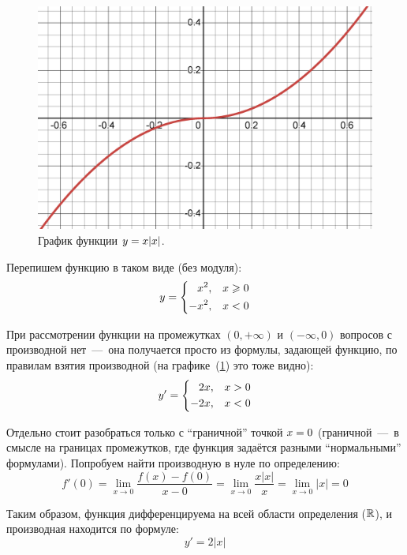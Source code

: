 \documentclass[a4paper,12pt]{article}
\begin{document}
  \begin{solution}
    \begin{figure}[ht]
        \centering
        
        \includegraphics[width=0.8\linewidth]{images/x-mod-x}
        
        \caption{График функции $y \hm= x|x|$.}
        \label{fig:1-13-179(3)}
    \end{figure}

    Перепишем функцию в таком виде (без модуля):
    \[
      y = \left\{
        \begin{aligned}
          &\hphantom{+}x^2, & &x \geq 0\\
          &{-}x^2, & &x < 0
        \end{aligned}
      \right.
    \]

    При рассмотрении функции на промежутках $(0, +\infty)$ и $(-\infty, 0)$ вопросов с производной нет~---~она получается просто из формулы, задающей функцию, по правилам взятия производной (на графике~(\ref{fig:1-13-179(3)}) это тоже видно):
    \[
      y' = \left\{
        \begin{aligned}
          &\hphantom{+}2x, & &x > 0\\
          &{-}2x, & &x < 0
        \end{aligned}
      \right.
    \]

    Отдельно стоит разобраться только с ``граничной'' точкой $x \hm= 0$ (граничной~---~в смысле на границах промежутков, где функция задаётся разными ``нормальными'' формулами).
    Попробуем найти производную в нуле по определению:
    \[
      f'(0) = \lim_{x \to 0} \frac{f(x) - f(0)}{x - 0}
        = \lim_{x \to 0} \frac{x |x|}{x}
        = \lim_{x \to 0} |x|
        = 0
    \]


    Таким образом, функция дифференцируема на всей области определения ($\RR$), и производная находится по формуле:
    \[
      y' = 2|x|
    \]
  \end{solution}
\end{document}
